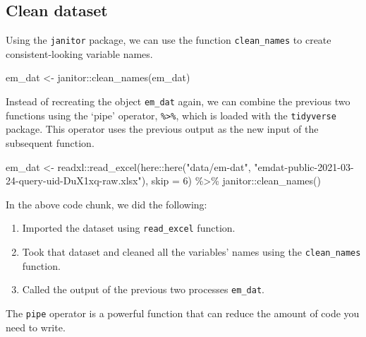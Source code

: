 \documentclass[
  12pt,
]{article}
\newenvironment{Shaded}{}{}
\newcommand{\AttributeTok}[1]{\textcolor[rgb]{0.49,0.56,0.16}{#1}}
\newcommand{\DecValTok}[1]{\textcolor[rgb]{0.25,0.63,0.44}{#1}}
\newcommand{\FunctionTok}[1]{\textcolor[rgb]{0.02,0.16,0.49}{#1}}
\newcommand{\NormalTok}[1]{#1}
\newcommand{\OtherTok}[1]{\textcolor[rgb]{0.00,0.44,0.13}{#1}}
\newcommand{\SpecialCharTok}[1]{\textcolor[rgb]{0.25,0.44,0.63}{#1}}
\newcommand{\StringTok}[1]{\textcolor[rgb]{0.25,0.44,0.63}{#1}}
\providecommand{\tightlist}{%
  \setlength{\itemsep}{0pt}\setlength{\parskip}{0pt}}
\begin{document}
\hypertarget{clean-dataset}{%
\subsection{Clean dataset}\label{clean-dataset}}

Using the \texttt{janitor} package, we can use the function
\texttt{clean\_names} to create consistent-looking variable names.

\begin{Shaded}
\begin{Highlighting}[]
\NormalTok{em\_dat }\OtherTok{\textless{}{-}}\NormalTok{ janitor}\SpecialCharTok{::}\FunctionTok{clean\_names}\NormalTok{(em\_dat)}
\end{Highlighting}
\end{Shaded}

Instead of recreating the object \texttt{em\_dat} again, we can combine
the previous two functions using the `pipe' operator,
\texttt{\%\textgreater{}\%}, which is loaded with the \texttt{tidyverse}
package. This operator uses the previous output as the new input of the
subsequent function.

\begin{Shaded}
\begin{Highlighting}[]
\NormalTok{em\_dat }\OtherTok{\textless{}{-}}\NormalTok{ readxl}\SpecialCharTok{::}\FunctionTok{read\_excel}\NormalTok{(here}\SpecialCharTok{::}\FunctionTok{here}\NormalTok{(}\StringTok{"data/em{-}dat"}\NormalTok{, }
    \StringTok{"emdat{-}public{-}2021{-}03{-}24{-}query{-}uid{-}DuX1xq{-}raw.xlsx"}\NormalTok{), }
    \AttributeTok{skip =} \DecValTok{6}\NormalTok{) }\SpecialCharTok{\%\textgreater{}\%}
\NormalTok{    janitor}\SpecialCharTok{::}\FunctionTok{clean\_names}\NormalTok{()}
\end{Highlighting}
\end{Shaded}

In the above code chunk, we did the following:

\begin{enumerate}
\def\labelenumi{\arabic{enumi}.}
\tightlist
\item
  Imported the dataset using \texttt{read\_excel} function.
\item
  Took that dataset and cleaned all the variables' names using the
  \texttt{clean\_names} function.
\item
  Called the output of the previous two processes \texttt{em\_dat}.
\end{enumerate}

The \texttt{pipe} operator is a powerful function that can reduce the
amount of code you need to write.
\end{document}
